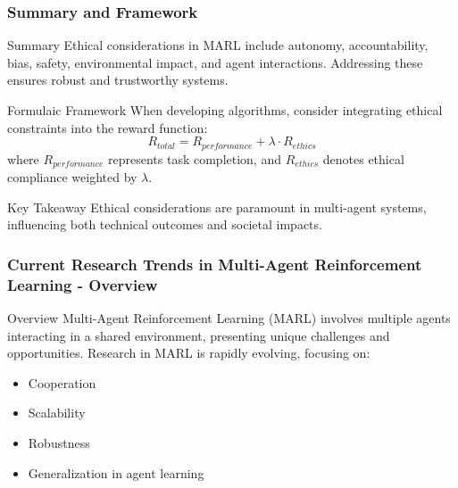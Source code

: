 \documentclass[aspectratio=169]{beamer}
\begin{document}
\begin{frame}[fragile]
    \frametitle{Summary and Framework}
    \begin{block}{Summary}
        Ethical considerations in MARL include autonomy, accountability, bias, safety, environmental impact, and agent interactions. Addressing these ensures robust and trustworthy systems.
    \end{block}
    
    \begin{block}{Formulaic Framework}
        When developing algorithms, consider integrating ethical constraints into the reward function:
        \begin{equation}
            R_{total} = R_{performance} + \lambda \cdot R_{ethics}
        \end{equation}
        where \(R_{performance}\) represents task completion, and \(R_{ethics}\) denotes ethical compliance weighted by \(\lambda\).
    \end{block}
    
    \begin{block}{Key Takeaway}
        Ethical considerations are paramount in multi-agent systems, influencing both technical outcomes and societal impacts.
    \end{block}
\end{frame}

\begin{frame}[fragile]
    \frametitle{Current Research Trends in Multi-Agent Reinforcement Learning - Overview}
    \begin{block}{Overview}
        Multi-Agent Reinforcement Learning (MARL) involves multiple agents interacting in a shared environment, presenting unique challenges and opportunities. 
        Research in MARL is rapidly evolving, focusing on:
        \begin{itemize}
            \item Cooperation
            \item Scalability
            \item Robustness
            \item Generalization in agent learning
        \end{itemize}
    \end{block}
\end{frame}
\end{document}

